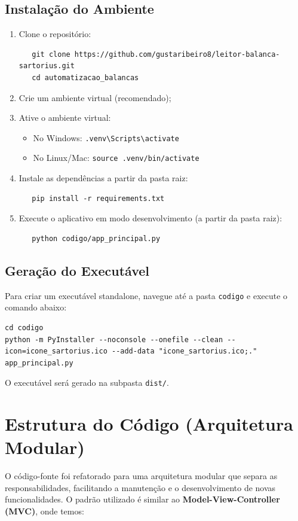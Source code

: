 \documentclass[12pt,a4paper]{article}
\begin{document}
\subsection{Instalação do Ambiente}
\begin{enumerate}
\item Clone o repositório:
   \begin{verbatim}
   git clone https://github.com/gustaribeiro8/leitor-balanca-sartorius.git
   cd automatizacao_balancas
   \end{verbatim}

\item Crie um ambiente virtual (recomendado);

\item Ative o ambiente virtual:
   \begin{itemize}
   \item No Windows: \texttt{.venv\textbackslash Scripts\textbackslash activate}
   \item No Linux/Mac: \texttt{source .venv/bin/activate}
   \end{itemize}

\item Instale as dependências a partir da pasta raiz:
   \begin{verbatim}
   pip install -r requirements.txt
   \end{verbatim}

\item Execute o aplicativo em modo desenvolvimento (a partir da pasta raiz):
   \begin{verbatim}
   python codigo/app_principal.py
   \end{verbatim}
\end{enumerate}

\subsection{Geração do Executável}
Para criar um executável standalone, navegue até a pasta \texttt{codigo} e execute o comando abaixo:

\begin{verbatim}
cd codigo
python -m PyInstaller --noconsole --onefile --clean --icon=icone_sartorius.ico --add-data "icone_sartorius.ico;." app_principal.py
\end{verbatim}


O executável será gerado na subpasta \texttt{dist/}.

\section{Estrutura do Código (Arquitetura Modular)}
O código-fonte foi refatorado para uma arquitetura modular que separa as responsabilidades, facilitando a manutenção e o desenvolvimento de novas funcionalidades. O padrão utilizado é similar ao \textbf{Model-View-Controller (MVC)}, onde temos:
\end{document}
